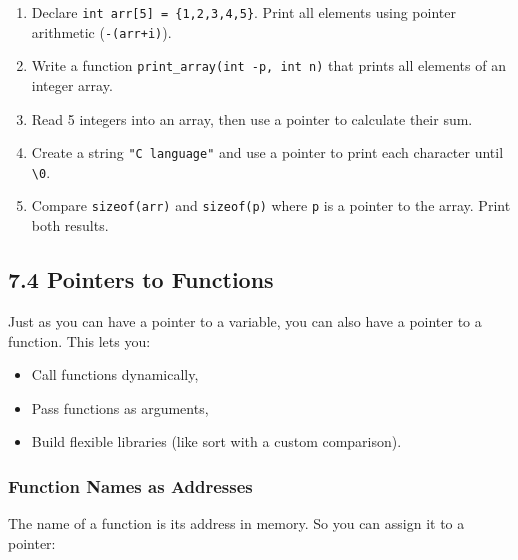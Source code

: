 \documentclass[
  letterpaper,
  DIV=11,
  numbers=noendperiod]{scrreprt}
\providecommand{\tightlist}{%
  \setlength{\itemsep}{0pt}\setlength{\parskip}{0pt}}
\begin{document}
\begin{enumerate}
\def\labelenumi{\arabic{enumi}.}
\tightlist
\item
  Declare \texttt{int\ arr{[}5{]}\ =\ \{1,2,3,4,5\}}. Print all elements
  using pointer arithmetic (\texttt{-(arr+i)}).
\item
  Write a function \texttt{print\_array(int\ -p,\ int\ n)} that prints
  all elements of an integer array.
\item
  Read 5 integers into an array, then use a pointer to calculate their
  sum.
\item
  Create a string \texttt{"C\ language"} and use a pointer to print each
  character until
  \texttt{\textquotesingle{}\textbackslash{}0\textquotesingle{}}.
\item
  Compare \texttt{sizeof(arr)} and \texttt{sizeof(p)} where \texttt{p}
  is a pointer to the array. Print both results.
\end{enumerate}

\subsection{7.4 Pointers to Functions}\label{pointers-to-functions}

Just as you can have a pointer to a variable, you can also have a
pointer to a function. This lets you:

\begin{itemize}
\tightlist
\item
  Call functions dynamically,
\item
  Pass functions as arguments,
\item
  Build flexible libraries (like sort with a custom comparison).
\end{itemize}

\subsubsection{Function Names as
Addresses}\label{function-names-as-addresses}

The name of a function is its address in memory. So you can assign it to
a pointer:
\end{document}
